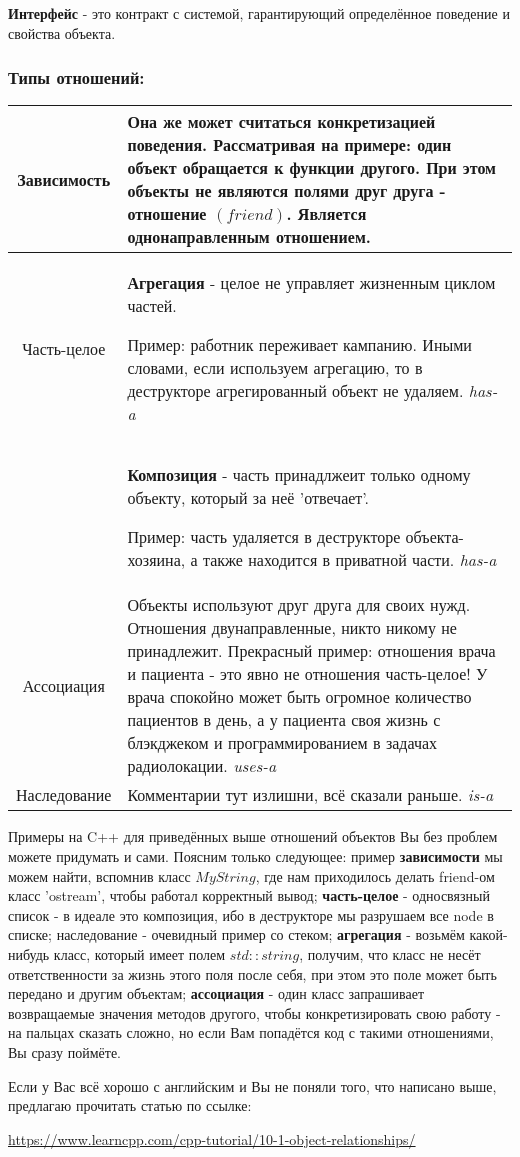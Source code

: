 \begin{definition}
    \textbf{Интерфейс} - это контракт с системой, гарантирующий определённое поведение и свойства объекта.
\end{definition}

\subsubsection{Типы отношений:}
\begin{tabular}{|c|p{15cm}|}
\hline
     Зависимость& Она же может считаться конкретизацией поведения.
     Рассматривая на примере: один объект обращается к функции другого.
     При этом объекты \textbf{не являются полями друг друга}
     - отношение $(friend)$. Является однонаправленным отношением.
     \\
\hline
     Часть-целое& \begin{definition}
         \textbf{Агрегация} - целое не управляет жизненным циклом частей.
     \end{definition}
     Пример: работник переживает кампанию. Иными словами, если используем агрегацию, то в деструкторе агрегированный объект не удаляем. \textit{has-a}\\
     \cline{2-2}
     & \begin{definition}
         \textbf{Композиция} - часть принадлжеит только одному объекту, который за неё 'отвечает'.
     \end{definition} Пример: часть удаляется в деструкторе объекта-хозяина, а также находится в приватной части. \textit{has-a}\\
\hline
     Ассоциация& Объекты используют друг друга для своих нужд. Отношения двунаправленные, никто никому не принадлежит. Прекрасный пример: отношения врача и пациента - это явно не отношения часть-целое! У врача спокойно может быть огромное количество пациентов в день, а у пациента своя жизнь с блэкджеком и программированием в задачах радиолокации. \textit{uses-a}\\
\hline
     Наследование& Комментарии тут излишни, всё сказали раньше. \textit{is-a} \\
\hline
\end{tabular}
\begin{notice}
    Примеры на C++ для приведённых выше отношений объектов Вы без проблем можете придумать и сами. Поясним только следующее: пример \textbf{зависимости} мы можем найти, вспомнив класс $MyString$, где нам приходилось делать friend-ом класс 'ostream', чтобы работал корректный вывод; \textbf{часть-целое} - односвязный список - в идеале это композиция, ибо в деструкторе мы разрушаем все node в списке; наследование - очевидный пример со стеком; \textbf{агрегация} - возьмём какой-нибудь класс, который имеет полем $std::string$, получим, что класс не несёт ответственности за жизнь этого поля после себя, при этом это поле может быть передано и другим объектам; \textbf{ассоциация} - один класс запрашивает возвращаемые значения методов другого, чтобы конкретизировать свою работу - на пальцах сказать сложно, но если Вам попадётся код с такими отношениями, Вы сразу поймёте.
\end{notice}
\begin{notice}
    Если у Вас всё хорошо с английским и Вы не поняли того, что написано выше, предлагаю прочитать статью по ссылке:
    
    \url{https://www.learncpp.com/cpp-tutorial/10-1-object-relationships/}
\end{notice}
